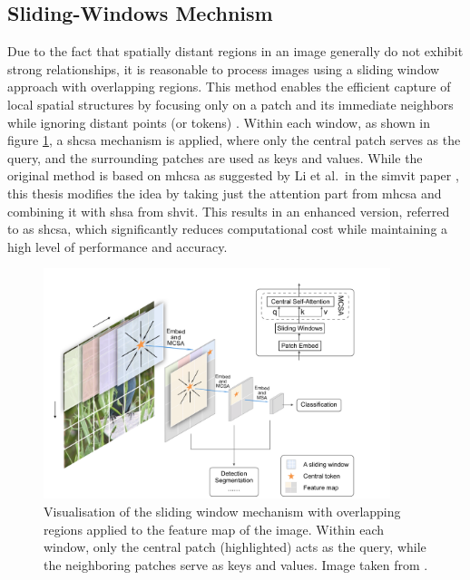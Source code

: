 \subsection{Sliding-Windows Mechnism}
Due to the fact that spatially distant regions in an image generally do not exhibit strong relationships, it is reasonable to process images using a sliding window approach with overlapping regions. This method enables the efficient capture of local spatial structures by focusing only on a patch and its immediate neighbors while ignoring distant points (or tokens) \cite{fu2025slidingwindowattentiontraining}. Within each window, as shown in figure \ref{Sliding_Window}, a \gls{shcsa} mechanism is applied, where only the central patch serves as the query, and the surrounding patches are used as keys and values. While the original method is based on \gls{mhcsa} as suggested by Li et al.~in the \acrshort{simvit} paper \cite{Li_2022}, this thesis modifies the idea by taking just the attention part from \gls{mhcsa} and combining it with \gls{shsa} from \gls{shvit}. This results in an enhanced version, referred to as \gls{shcsa}, which significantly reduces computational cost while maintaining a high level of performance and accuracy.

\begin{figure}[H]
	\centering
	\includegraphics[width=0.9\textwidth]{./images/motivation6.pdf}
	\caption[Visualisation of the sliding window mechanism]{Visualisation of the sliding window mechanism with overlapping regions applied to the feature map of the image. Within each window, only the central patch (highlighted) acts as the query, while the neighboring patches serve as keys and values. Image taken from \cite{fu2025slidingwindowattentiontraining}.}
	\label{Sliding_Window}
\end{figure}



